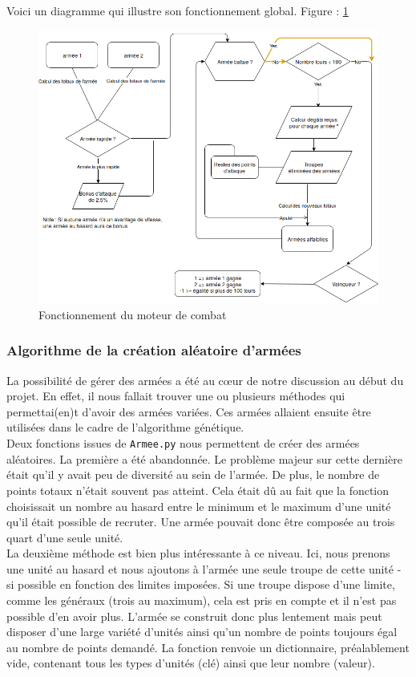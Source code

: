 \documentclass[a4paper]{article} %
\begin{document}
Voici un diagramme qui illustre son fonctionnement global. Figure :  \ref{fig:DiagrammeMoteurCombat}
\begin{figure}[!h]
	\begin{center}
	\includegraphics[width=12cm]{Images/Diagramme_moteur_combat.png}
	\caption{Fonctionnement du moteur de combat\label{fig:DiagrammeMoteurCombat}}
	\end{center}
\end{figure}

		\subsubsection{Algorithme de la création aléatoire d'armées}\label{aléatoire}
La possibilité de gérer des armées a été au cœur de notre discussion au début du projet. En effet, il nous fallait trouver une ou plusieurs méthodes qui permettai(en)t d'avoir des armées variées. Ces armées allaient ensuite être utilisées dans le cadre de l'algorithme génétique.\\

Deux fonctions issues de \texttt{Armee.py} nous permettent de créer des armées aléatoires. La première a été abandonnée. Le problème majeur sur cette dernière était qu'il y avait peu de diversité au sein de l'armée. De plus, le nombre de points totaux n'était souvent pas atteint. Cela était dû au fait que la fonction choisissait un nombre au hasard entre le minimum et le maximum d'une unité qu'il était possible de recruter. Une armée pouvait donc être composée au trois quart d'une seule unité.\\

La deuxième méthode est bien plus intéressante à ce niveau. Ici, nous prenons une unité au hasard et nous ajoutons à l'armée une seule troupe de cette unité - si possible en fonction des limites imposées. Si une troupe dispose d'une limite, comme les généraux (trois au maximum), cela est pris en compte et il n'est pas possible d'en avoir plus. L'armée se construit donc plus lentement mais peut disposer d'une large variété d'unités ainsi qu'un nombre de points toujours égal au nombre de points demandé. La fonction renvoie un dictionnaire, préalablement vide, contenant tous les types d'unités (clé) ainsi que leur nombre (valeur).\\
\end{document}

